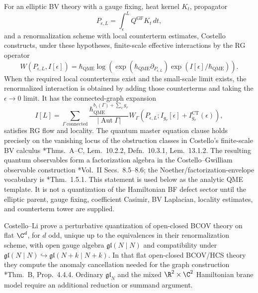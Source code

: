 \documentclass[11pt]{memoir}
\begin{document}
\begin{stmt}\label{stmt:costello-bv-construction}
  For an elliptic BV theory with a gauge fixing, heat kernel $K_t$, propagator
  $$P_{\epsilon,L}=\int_{\epsilon}^{L}Q^{\mathrm{GF}}K_t\,dt,$$
  and a renormalization scheme with local counterterm estimates, Costello
  constructs, under these hypotheses, finite-scale effective
  interactions by the RG operator
  $$W(P_{\epsilon,L},I[\epsilon])
    =\hbar_{\mathrm{QME}}\log\!\left(\exp(\hbar_{\mathrm{QME}}\partial_{P_{\epsilon,L}})
       \exp(I[\epsilon]/\hbar_{\mathrm{QME}})\right).$$
  When the required local counterterms exist and the small-scale limit
  exists, the renormalized interaction is obtained by adding those
  counterterms and taking the $\epsilon\to0$ limit. It has the
  connected-graph expansion
  $$I[L]=\sum_{\Gamma\ \mathrm{connected}}
    \frac{\hbar_{\mathrm{QME}}^{b_1(\Gamma)+\sum_v g_v}}{|\operatorname{Aut}\Gamma|}
    W_\Gamma(P_{\epsilon,L};I_{g_v}[\epsilon]+I^{\mathrm{CT}}_{g_v}(\epsilon)),$$
  satisfies RG flow and locality.  The quantum master equation clause holds
  precisely on the vanishing locus of the obstruction classes in
  Costello's finite-scale BV calculus
  \cite{costello-renormalization}*{Thms.~A--C, Lem.~10.2.2,
  Defn.~10.3.1, Lem.~13.1.2}. The resulting quantum observables form a
  factorization algebra in the Costello--Gwilliam observable construction
  \cite{costello-gwilliam-vol2}*{Vol.~II Secs.~8.5--8.6}; the
  Noether/factorization-envelope vocabulary is
  \cite{costello-gwilliam-vol2}*{Thm.~1.5.1}.
  This statement is used below as the analytic QME template.  It is not
  a quantization of the Hamiltonian BF defect sector until the elliptic
  parent, gauge fixing, coefficient Casimir, BV Laplacian, locality
  estimates, and counterterm tower are supplied.
\end{stmt}

\begin{stmt}\label{stmt:costello-li-flat-bcov}
  Costello--Li prove a perturbative quantization of open-closed BCOV
  theory on flat $\C^d$, for $d$ odd, unique up to the equivalences in their
  renormalization scheme, with open gauge algebra
  $\mathfrak{gl}(N\mid N)$ and compatibility under
  $\mathfrak{gl}(N\mid N)\hookrightarrow\mathfrak{gl}(N+k\mid N+k)$. In that
  flat open-closed BCOV/HCS theory they compute the anomaly cancellation needed
  for the graph construction
  \cite{costello-li-open-closed-bcov}*{Thm.~B, Prop.~4.4.4}. Ordinary
  $\mathfrak{gl}_N$ and the mixed $\R^2\times\C^2$ Hamiltonian brane model
  require an additional reduction or summand argument.
\end{stmt}
\end{document}
